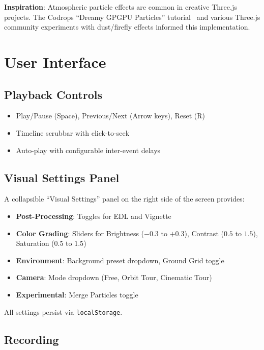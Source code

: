 \documentclass[11pt, letterpaper]{article}
\begin{document}
\textbf{Inspiration}: Atmospheric particle effects are common in creative Three.js projects. The Codrops ``Dreamy GPGPU Particles'' tutorial~\cite{codrops_particles} and various Three.js community experiments with dust/firefly effects informed this implementation.

\section{User Interface}

\subsection{Playback Controls}
\begin{itemize}
    \item Play/Pause (Space), Previous/Next (Arrow keys), Reset (R)
    \item Timeline scrubbar with click-to-seek
    \item Auto-play with configurable inter-event delays
\end{itemize}

\subsection{Visual Settings Panel}

A collapsible ``Visual Settings'' panel on the right side of the screen provides:

\begin{itemize}
    \item \textbf{Post-Processing}: Toggles for EDL and Vignette
    \item \textbf{Color Grading}: Sliders for Brightness ($-0.3$ to $+0.3$), Contrast ($0.5$ to $1.5$), Saturation ($0.5$ to $1.5$)
    \item \textbf{Environment}: Background preset dropdown, Ground Grid toggle
    \item \textbf{Camera}: Mode dropdown (Free, Orbit Tour, Cinematic Tour)
    \item \textbf{Experimental}: Merge Particles toggle
\end{itemize}

All settings persist via \texttt{localStorage}.

\subsection{Recording}
\end{document}
